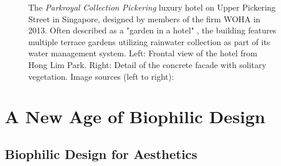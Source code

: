\documentclass{article}
\begin{document}
\begin{figure}[ht!]
    \centering
    \caption{The \textit{Parkroyal Collection Pickering} luxury hotel on Upper Pickering Street in Singapore, designed by members of the firm WOHA in 2013. Often described as a "garden in a hotel" \cite{hill_take_2021}, the building features multiple terrace gardens utilizing rainwater collection as part of its water management system. Left: Frontal view of the hotel from Hong Lim Park. Right: Detail of the concrete facade with solitary vegetation. Image sources (left to right): \cite{morin_hotel_2018}\cite{smu_constitutional_and_administrative_law_wikipedia_project_parkroyal_2013}}
    \label{fig:parkroyal}
\end{figure}

\clearpage
\section{A New Age of Biophilic Design}

\subsection{Biophilic Design for Aesthetics}
\end{document}
